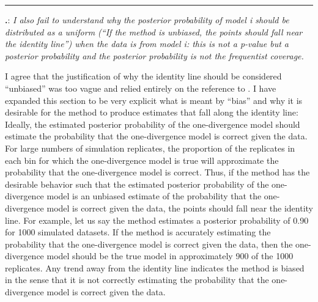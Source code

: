 \documentclass[12pt]{article}
\newcounter{commentCounter}
\newcommand{\revcomment}[1]{{\addtocounter{commentCounter}{1}}
    \medskip \hrule \noindent
\textbf{\arabic{section}.\arabic{commentCounter}}: {\sl #1}\par\xspace}
\newcommand{\response}[1]{{\addtolength{\leftskip}{0.25in} #1\par}\xspace}
\let\quoteOld\quote
\let\endquoteOld\endquote
\renewenvironment{quote}{\sffamily\small\quoteOld}{\endquoteOld}
\begin{document}
\revcomment{
    I also fail to understand why the posterior probability of model i should
    be distributed as a uniform (``If the method is unbiased, the points should
    fall near the identity line'') when the data is from model i: this is not a
    p-value but a posterior probability and the posterior probability is not
    the frequentist coverage.
}
\response{
    I agree that the justification of why the identity line should be considered
    ``unbiased'' was too vague and relied entirely on the reference to
    \cite{Huelsenbeck2004}. I have expanded this section to be very
    explicit what is meant by ``bias'' and why it is desirable for the method
    to produce estimates that fall along the identity line:
    \begin{quote}
        Ideally, the estimated posterior probability of the one-divergence model
        should estimate the probability that the one-divergence model is
        correct given the data.  For large numbers of simulation replicates,
        the proportion of the replicates in each bin for which the
        one-divergence model is true will approximate the probability that the
        one-divergence model is correct.  Thus, if the method has the desirable
        behavior such that the estimated posterior probability of
        the one-divergence model is an unbiased estimate of the probability
        that the one-divergence model is correct given the data, the points
        should fall near the identity line.  For example, let us say the method
        estimates a posterior probability of 0.90 for 1000 simulated datasets.
        If the method is accurately estimating the probability that the
        one-divergence model is correct given the data, then the one-divergence
        model should be the true model in approximately 900 of the 1000
        replicates.  Any trend away from the identity line indicates the method
        is biased in the sense that it is not correctly estimating the
        probability that the one-divergence model is correct given the data.
    \end{quote}
}
\end{document}
